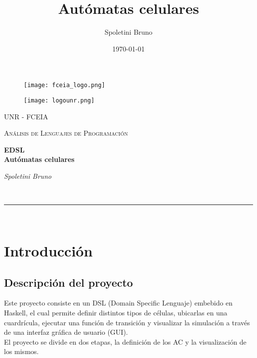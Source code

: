 \documentclass[fleqn,a4paper,11pt]{article}
\makeatletter
\def\PARTICIPANTES{Spoletini Bruno}
\def\MATERIA{Análisis de Lenguajes de Programación}
\def\TITULOTRABAJO{Autómatas celulares}
\newcommand{\linia}{\rule{\linewidth}{0.5pt}}
\theoremstyle{mytheor}
\renewcommand{\maketitle}{
\begin{center}
\vspace{2ex}
{\huge \textsc{\@title}}
\vspace{1ex}
\\
\linia\\
\@author \hfill \@date
\vspace{4ex}
\end{center}
}
\makeatother
\begin{document}
\begin{titlepage}
	\centering

	\begin{figure}[t]
	\raggedleft
    \texttt{[image: fceia\_logo.png]}
    \hfill
	\raggedright
    \texttt{[image: logounr.png]}
    \end{figure}
    \vspace{5cm}
	{\scshape\LARGE UNR - FCEIA \par}
	\vspace{1cm}
	{\scshape\Large \MATERIA\par}
	\vspace{1.5cm}
	{\Huge\bfseries EDSL \\ \TITULOTRABAJO\par}
	\vspace{2cm}
	{\Large\itshape \PARTICIPANTES \par}
	\vspace{4cm}


	\vfill

\end{titlepage}

\title{ \TITULOTRABAJO}

\author{\PARTICIPANTES}

\date{\today}

\maketitle


\section{Introducción}

 \subsection{Descripción del proyecto}
Este proyecto consiste en un DSL (Domain Specific Lenguaje) embebido en Haskell, el cual permite definir distintos tipos de células, ubicarlas en una cuardrícula, ejecutar una función de transición y visualizar la simulación a través de una interfaz gráfica de usuario (GUI). \\
El proyecto se divide en dos etapas, la definición de los AC y la visualización de los mismos.
\end{document}
